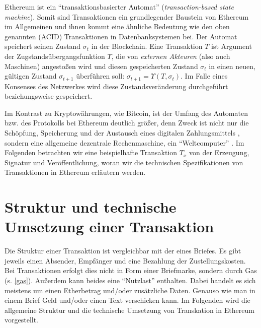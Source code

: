 \documentclass[runningheads]{llncs}
\begin{document}
Ethereum ist ein "`transaktionsbasierter Automat"' (\textit{transaction-based state machine}). Somit sind Transaktionen ein grundlegender Baustein von Ethereum im Allgemeinen und ihnen kommt eine ähnliche Bedeutung wie den oben genannten (ACID) Transaktionen in Datenbanksystemen bei. Der Automat speichert seinen Zustand $ \sigma_t $ in der Blockchain. Eine Transaktion $ T $ ist Argument der Zugstandsübergangsfunktion $ \Upsilon $, die von \textit{externen Akteuren} (also auch Maschinen) angestoßen wird und diesen gespeicherten Zustand $ \sigma_t $ in einen neuen, gültigen Zustand $ \sigma_{t + 1} $ überführen soll: $\sigma_{t+1} = \Upsilon(T, \sigma_t) $. Im Falle eines Konsenses des Netzwerkes wird diese Zustandsveränderung durchgeführt beziehungsweise gespeichert.

Im Kontrast zu Kryptowährungen, wie Bitcoin, ist der Umfang des Automaten bzw. des Protokolls bei Ethereum deutlich größer, denn Zweck ist nicht nur die Schöpfung, Speicherung und der Austausch eines digitalen Zahlungsmittels \cite{nakamoto_bitcoin_nodate}, sondern eine allgemeine dezentrale Rechenmaschine, ein "`Weltcomputer"' \cite[S. 1-4]{wood_ethereum/yellowpaper_2019}. Im Folgenden betrachten wir eine beispielhafte Transaktion $ T_x $ von der Erzeugung, Signatur und Veröffentlichung, woran wir die technischen Spezifikationen von Transaktionen in Ethereum erläutern werden.

\section{Struktur und technische Umsetzung einer Transaktion}
Die Struktur einer Transaktion ist vergleichbar mit der eines Briefes. Es gibt jeweils einen Absender, Empfänger und eine Bezahlung der Zustellungskosten. Bei Transaktionen erfolgt dies nicht in Form einer Briefmarke, sondern durch Gas (s. \ref{gas}). Außerdem kann beides eine "`Nutzlast"' \cite[S. 108]{antonopoulos_mastering_2019} enthalten. Dabei handelt es sich meistens um einen Etherbetrag und/oder zusätzliche Daten. Genauso wie man in einem Brief Geld und/oder einen Text verschicken kann. Im Folgenden wird die allgemeine Struktur und die technische Umsetzung von Transkation in Ethereum vorgestellt.
\end{document}
